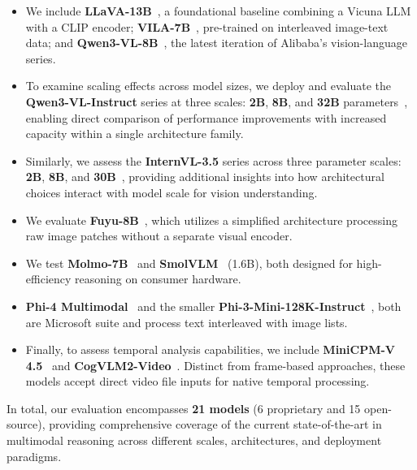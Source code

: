\begin{itemize}
    \item We include \textbf{LLaVA-13B}~\cite{liu2023visual}, a foundational baseline combining a Vicuna LLM with a CLIP encoder; \textbf{VILA-7B}~\cite{lin2023vila}, pre-trained on interleaved image-text data; and \textbf{Qwen3-VL-8B}~\cite{bai2025qwen25vl}, the latest iteration of Alibaba's vision-language series.
    
    \item To examine scaling effects across model sizes, we deploy and evaluate the \textbf{Qwen3-VL-Instruct} series at three scales: \textbf{2B}, \textbf{8B}, and \textbf{32B} parameters~\cite{bai2025qwen25vl}, enabling direct comparison of performance improvements with increased capacity within a single architecture family.

    \item Similarly, we assess the \textbf{InternVL-3.5} series across three parameter scales: \textbf{2B}, \textbf{8B}, and \textbf{30B}~\cite{chen2024internvl}, providing additional insights into how architectural choices interact with model scale for vision understanding.

    \item  We evaluate \textbf{Fuyu-8B}~\cite{adept2023fuyu}, which utilizes a simplified architecture processing raw image patches without a separate visual encoder.
    
    \item We test \textbf{Molmo-7B}~\cite{allenai2025molmo} and \textbf{SmolVLM}~\cite{marafioti2025smolvlm} (1.6B), both designed for high-efficiency reasoning on consumer hardware.
    
    \item \textbf{Phi-4 Multimodal}~\cite{microsoft2025phi4multi} and the smaller \textbf{Phi-3-Mini-128K-Instruct}~\cite{microsoft2024phi3}, both are Microsoft suite and process text interleaved with image lists.
    
    \item Finally, to assess temporal analysis capabilities, we include \textbf{MiniCPM-V 4.5}~\cite{yao2024minicpmv} and \textbf{CogVLM2-Video}~\cite{wang2024cogvlm2}. Distinct from frame-based approaches, these models accept direct video file inputs for native temporal processing.
\end{itemize}

In total, our evaluation encompasses \textbf{21 models} (6 proprietary and 15 open-source), providing comprehensive coverage of the current state-of-the-art in multimodal reasoning across different scales, architectures, and deployment paradigms.


